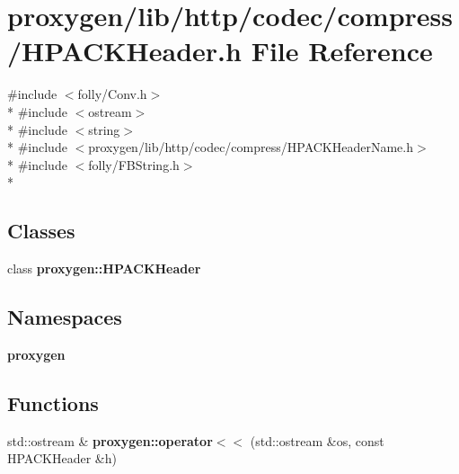 \section{proxygen/lib/http/codec/compress/\+H\+P\+A\+C\+K\+Header.h File Reference}
\label{HPACKHeader_8h}
{\ttfamily \#include $<$folly/\+Conv.\+h$>$}\\*
{\ttfamily \#include $<$ostream$>$}\\*
{\ttfamily \#include $<$string$>$}\\*
{\ttfamily \#include $<$proxygen/lib/http/codec/compress/\+H\+P\+A\+C\+K\+Header\+Name.\+h$>$}\\*
{\ttfamily \#include $<$folly/\+F\+B\+String.\+h$>$}\\*
\subsection*{Classes}
\begin{DoxyCompactItemize}
\item 
class {\bf proxygen\+::\+H\+P\+A\+C\+K\+Header}
\end{DoxyCompactItemize}
\subsection*{Namespaces}
\begin{DoxyCompactItemize}
\item 
 {\bf proxygen}
\end{DoxyCompactItemize}
\subsection*{Functions}
\begin{DoxyCompactItemize}
\item 
std\+::ostream \& {\bf proxygen\+::operator$<$$<$} (std\+::ostream \&os, const H\+P\+A\+C\+K\+Header \&h)
\end{DoxyCompactItemize}
